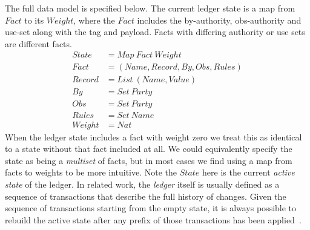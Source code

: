 The full data model is specified below. The current ledger state is a map from $Fact$ to its $Weight$, where the $Fact$ includes the by-authority, obs-authority and use-set along with the tag and payload. Facts with differing authority or use sets are different facts.
$$
\begin{array}{ll}
   State   & = Map~ Fact~ Weight
\\ Fact    & = (Name, Record, By, Obs, Rules)
\\ Record  & = List~ (Name, Value)
\\ By      & = Set~ Party
\\ Obs     & = Set~ Party
\\ Rules   & = Set~ Name
\\ Weight  & = Nat
\end{array}
$$
When the ledger state includes a fact with weight zero we treat this as identical to a state without that fact included at all. We could equivalently specify the state as being a \emph{multiset} of facts, but in most cases we find using a map from facts to weights to be more intuitive. Note the $State$ here is the current \emph{active state} of the ledger. In related work, the \emph{ledger} itself is usually defined as a sequence of transactions that describe the full history of changes. Given the sequence of transactions starting from the empty state, it is always possible to rebuild the active state after any prefix of those transactions has been applied~\cite{Zahnentferner2018:Chimeric}.



